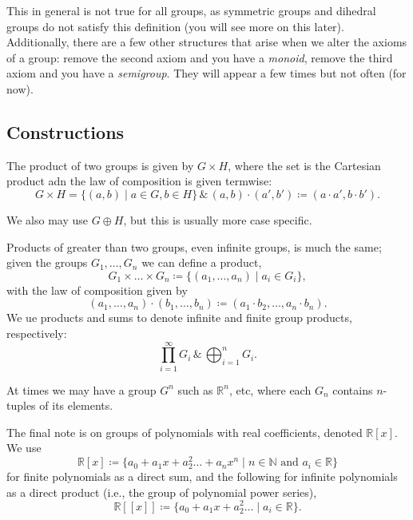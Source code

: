 \documentclass{report}
\begin{document}
This in general is not true for all groups, as symmetric groups and dihedral groups do not satisfy this definition (you will see more on this later). Additionally, there are a few other structures that arise when we alter the axioms of a group: remove the second axiom and you have a \textit{monoid}, remove the third axiom and you have a \textit{semigroup}. They will appear a few times but not often (for now).

\subsection{Constructions}

\begin{definition}
  The product of two groups is given by \( G\times H \), where the set is the Cartesian product adn the law of composition is given termwise:
  \begin{displaymath}
    G\times H = \{(a,b)\mid a \in G,b\in H\} \, \& \, (a,b)\cdot (a',b')\coloneqq (a\cdot a',b\cdot b').
  \end{displaymath}
  
\end{definition}
We also may use \( G\oplus H \), but this is usually more case specific. 

Products of greater than two groups, even infinite groups, is much the same; given the groups \(G_{1},\ldots ,G_n\) we can define a product, \[ G_{1}\times \ldots \times G_n \coloneqq  \{ (a_{1},\ldots ,a_n) \mid  a_i \in  G_i \},\] with the law of composition given by \[ (a_{1},\ldots ,a_n)\cdot (b_{1},\ldots ,b_n)\coloneqq (a_{1}\cdot b_{2},\ldots ,a_n \cdot b_n).\] 
We ue products and sums to denote infinite and finite group products, respectively:\[
  \prod^{\infty}_{i=1} G_i \, \& \, \bigoplus_{i=1}^n G_i
.\] 

At times we may have a group \( G^n \) such as \( \mathbb{R}^n \), etc, where each \( G_n \) contains \( n \)-tuples of its elements. 

The final note is on groups of polynomials with real coefficients, denoted \( \mathbb{R}[x] \). We use \[
  \mathbb{R}[x] \coloneqq \{ a_{0}+a_{1}x+a_{2}^2\ldots +a_nx^n \mid  n \in  \mathbb{N} \text{ and } a_i \in  \mathbb{R} \}\]  for finite polynomials as a direct sum, and the following for infinite polynomials as a direct product (i.e., the group of polynomial power series), \[
  \mathbb{R}[[x]] \coloneqq \{ a_{0}+a_{1}x+a_{2}^2\ldots \mid a_i \in  \mathbb{R} \}
  .\] 
\end{document}
